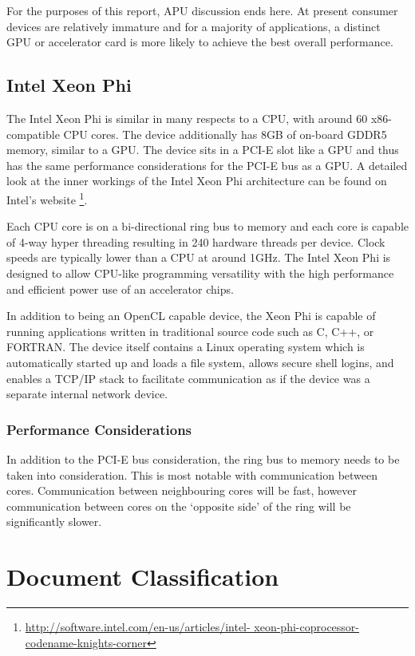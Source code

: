 For the purposes of this report, APU discussion ends here. At present consumer
devices are relatively immature and for a majority of applications, a distinct
GPU or accelerator card is more likely to achieve the best overall performance.

\subsection{Intel Xeon Phi}

The Intel Xeon Phi is similar in many respects to a CPU, with around 60
x86-compatible CPU cores. The device additionally has 8GB of on-board GDDR5
memory, similar to a GPU. The device sits in a PCI-E slot like a GPU and thus
has the same performance considerations for the PCI-E bus as a GPU. A detailed
look at the inner workings of the Intel Xeon Phi architecture can be found on
Intel's website \footnote{\url{http://software.intel.com/en-us/articles/intel-
xeon-phi-coprocessor-codename-knights-corner}}.

Each CPU core is on a bi-directional ring bus to memory and each core is capable
of 4-way hyper threading resulting in 240 hardware threads per device. Clock
speeds are typically lower than a CPU at around 1GHz. The Intel Xeon Phi is
designed to allow CPU-like programming versatility with the high performance and
efficient power use of an accelerator chips.

In addition to being an OpenCL capable device, the Xeon Phi is capable of
running applications written in traditional source code such as C, C++, or
FORTRAN. The device itself contains a Linux operating system which is
automatically started up and loads a file system, allows secure shell logins,
and enables a TCP/IP stack to facilitate communication as if the device was a
separate internal network device.

\subsubsection{Performance Considerations}

In addition to the PCI-E bus consideration, the ring bus to memory needs to be
taken into consideration. This is most notable with communication between cores.
Communication between neighbouring cores will be fast, however communication
between cores on the `opposite side' of the ring will be significantly slower.

\section{Document Classification}

